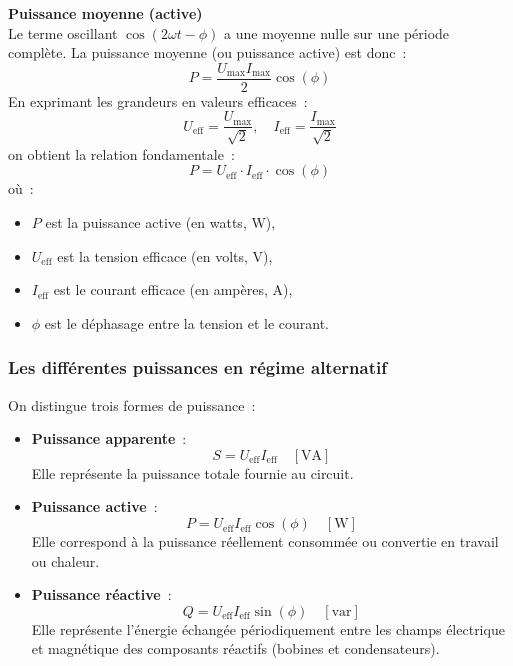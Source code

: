 \begin{Note}{\textbf{Puissance moyenne (active)}}\\
Le terme oscillant $\cos(2\omega t - \phi)$ a une moyenne nulle sur une p\'eriode complète.
La puissance moyenne (ou puissance active) est donc~:
\[
P = \frac{U_{\text{max}} I_{\text{max}}}{2} \cos(\phi)
\]
En exprimant les grandeurs en valeurs efficaces~:
\[
U_{\text{eff}} = \frac{U_{\text{max}}}{\sqrt{2}}, \quad I_{\text{eff}} = \frac{I_{\text{max}}}{\sqrt{2}}
\]
on obtient la relation fondamentale~:
\[
\boxed{P = U_{\text{eff}} \cdot I_{\text{eff}} \cdot \cos(\phi)}
\]
où~:
\begin{itemize}
    \item $P$ est la puissance active (en watts, W),
    \item $U_{\text{eff}}$ est la tension efficace (en volts, V),
    \item $I_{\text{eff}}$ est le courant efficace (en ampères, A),
    \item $\phi$ est le d\'ephasage entre la tension et le courant.
\end{itemize}
\end{Note}

\subsubsection*{Les diff\'erentes puissances en r\'egime alternatif}
On distingue trois formes de puissance~:
\begin{itemize}
    \item \textbf{Puissance apparente}~:
    \[
    S = U_{\text{eff}} I_{\text{eff}} \quad [\text{VA}]
    \]
    Elle repr\'esente la puissance totale fournie au circuit.

    \item \textbf{Puissance active}~:
    \[
    P = U_{\text{eff}} I_{\text{eff}} \cos(\phi) \quad [\text{W}]
    \]
    Elle correspond à la puissance r\'eellement consomm\'ee ou convertie en travail ou chaleur.

    \item \textbf{Puissance r\'eactive}~:
    \[
    Q = U_{\text{eff}} I_{\text{eff}} \sin(\phi) \quad [\text{var}]
    \]
    Elle repr\'esente l’\'energie \'echang\'ee p\'eriodiquement entre les champs \'electrique et magn\'etique des composants r\'eactifs (bobines et condensateurs).
\end{itemize}

